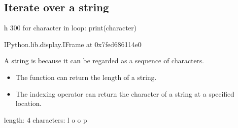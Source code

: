 \documentclass[letterpaper,10pt,english]{sphinxmanual}
\begin{document}
\subsection{Iterate over a string}
\label{\detokenize{Lecture3/Iteration:iterate-over-a-string}}

\begin{sphinxVerbatim}[commandchars=\\\{\}]
 \PYGZhy{}h 300
for character in \PYGZsq{}loop\PYGZsq{}: print(character)
\end{sphinxVerbatim}

\begin{sphinxVerbatim}[commandchars=\\\{\}]
\PYGZlt{}IPython.lib.display.IFrame at 0x7fed686114e0\PYGZgt{}
\end{sphinxVerbatim}

A string is  because it can be regarded as a sequence of characters.
\begin{itemize}
\item {} 
The function  can return the length of a string.

\item {} 
The indexing operator \sphinxcode{\sphinxupquote{{[}{]}}} can return the character of a string at a specified location.

\end{itemize}

\begin{sphinxVerbatim}[commandchars=\\\{\}]
  
 
 \PYG{p}{[}\PYG{p}{]} \PYG{p}{[}\PYG{p}{]} \PYG{p}{[}\PYG{p}{]} \PYG{p}{[}\PYG{p}{]}
\end{sphinxVerbatim}

\begin{sphinxVerbatim}[commandchars=\\\{\}]
length: 4
characters: l o o p
\end{sphinxVerbatim}
\end{document}

